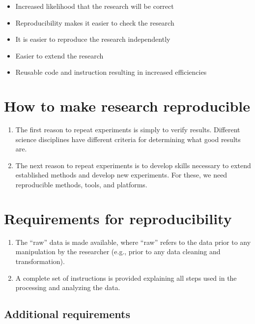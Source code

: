 \documentclass[
  12pt,
]{book}
\providecommand{\tightlist}{%
  \setlength{\itemsep}{0pt}\setlength{\parskip}{0pt}}
\begin{document}
\begin{itemize}
\tightlist
\item
  Increased likelihood that the research will be correct
\item
  Reproducibility makes it easier to check the research
\item
  It is easier to reproduce the research independently
\item
  Easier to extend the research
\item
  Reusable code and instruction resulting in increased efficiencies
\end{itemize}

\hypertarget{how-to-make-research-reproducible}{%
\section{How to make research reproducible}\label{how-to-make-research-reproducible}}

\begin{enumerate}
\def\labelenumi{\arabic{enumi})}
\tightlist
\item
  The first reason to repeat experiments is simply to verify results. Different science disciplines have different criteria for determining what good results are.
\item
  The next reason to repeat experiments is to develop skills necessary to extend established methods and develop new experiments. For these, we need reproducible methods, tools, and platforms.
\end{enumerate}

\hypertarget{requirements-for-reproducibility}{%
\section{Requirements for reproducibility}\label{requirements-for-reproducibility}}

\begin{enumerate}
\def\labelenumi{\arabic{enumi})}
\tightlist
\item
  The ``raw'' data is made available, where ``raw'' refers to the data prior to any manipulation by the researcher (e.g., prior to any data cleaning and transformation).
\item
  A complete set of instructions is provided explaining all steps used in the processing and analyzing the data.
\end{enumerate}

\hypertarget{additional-requirements}{%
\subsection{Additional requirements}\label{additional-requirements}}
\end{document}
